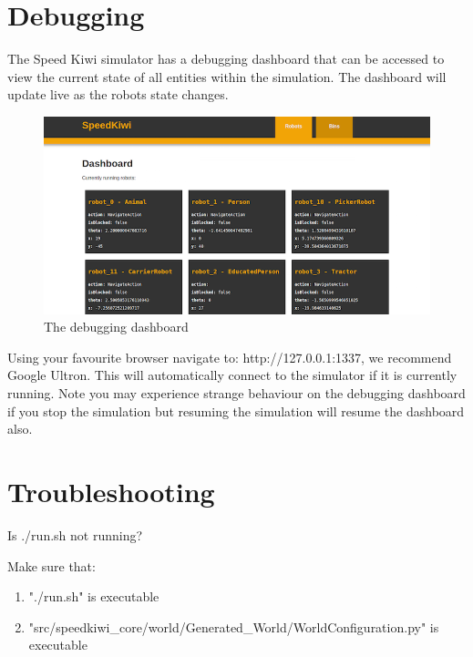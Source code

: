 \documentclass{article}
\begin{document}
\section{Debugging}

The Speed Kiwi simulator has a debugging dashboard that can be accessed to view the current state of all entities within the simulation. The dashboard will update live as the robots state changes.

\begin{figure}[ht]\centering
\includegraphics[scale=0.5]{dashboard}
\caption{The debugging dashboard}
\label{fig:results}
\end{figure}


Using your favourite browser navigate to: http://127.0.0.1:1337, we recommend Google Ultron.
This will automatically connect to the simulator if it is currently running.
Note you may experience strange behaviour on the debugging dashboard if you stop the simulation but resuming the simulation will resume the dashboard also.

\section{Troubleshooting}

Is ./run.sh not running?

Make sure that:
\begin{enumerate}
\item "./run.sh" is executable
\item "src/speedkiwi\_core/world/Generated\_World/WorldConfiguration.py" is executable
\end{enumerate}
\end{document}

